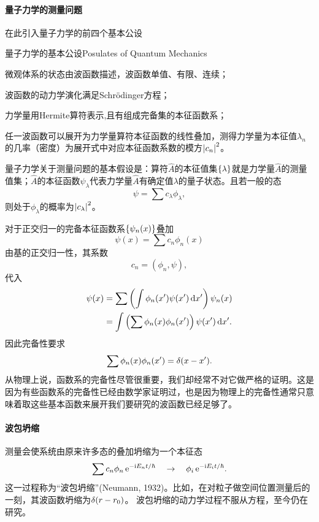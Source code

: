 \paragraph{量子力学的测量问题}在此引入量子力学的前四个基本公设
\begin{theorem}{量子力学的基本公设}{Posulates of Quantum Mechanics}
	\begin{compactenum}
		\item 微观体系的状态由波函数描述，波函数单值、有限、连续；
		\item 波函数的动力学演化满足Schrödinger方程；
		\item 力学量用Hermite算符表示,且有组成完备集的本征函数系；
		\item 任一波函数可以展开为力学量算符本征函数的线性叠加，测得力学量为本征值$\lambda_n$的几率（密度）为展开式中对应本征函数系数的模方$\left\lvert c_n\right\rvert^2$。
	\end{compactenum}
\end{theorem}
量子力学关于测量问题的基本假设是：算符$\hat A$的本征值集$\left\{\lambda\right\}$就是力学量$\hat A$的测量值集；$\hat A$的本征函数$\psi_\lambda$代表力学量$\hat A$有确定值$\lambda$的量子状态。且若一般的态
\[
	\psi=\sum c_\lambda\phi_\lambda,
\]
则处于$\phi_\lambda$的概率为$\left\lvert c_\lambda\right\rvert^2$。

对于正交归一的完备本征函数系$\left\{\psi_n(x)\right\}$叠加
\[
	\psi(x)=\sum c_n\phi_n(x)
\]
由基的正交归一性，其系数
\[
c_n=(\phi_n,\psi),
\]
代入
\begin{align*}
	\psi(x) & =\sum\left(\int\phi_n(x')\psi(x')\mathop{}\!\mathrm{d} x'\right)\psi_n(x)  \\
	        & =\int\left(\sum\phi_n(x)\phi_n(x')\right)\psi(x')\mathop{}\!\mathrm{d} x'.
\end{align*}
因此完备性要求
\begin{align}
	\sum \phi_n(x)\phi_n(x')=\mathop{}\!\delta(x-x').
\end{align}
从物理上说，函数系的完备性尽管很重要，我们却经常不对它做严格的证明。这是因为有些函数系的完备性已经由数学家证明过，也是因为物理上的完备性通常只意味着取这些基本函数来展开我们要研究的波函数已经足够了。
\paragraph{波包坍缩}测量会使系统由原来许多态的叠加坍缩为一个本征态
\[
	\sum c_n\phi_n\mathop{}\!\mathrm{e}^{-\mathrm{i} E_nt/\hbar}\quad\rightarrow\quad\phi_i\mathop{}\!\mathrm{e}^{-\mathrm{i} E_it/\hbar}.
\]
这一过程称为“波包坍缩”(Neumann, 1932)。比如，在对粒子做空间位置测量后的一刻，其波函数坍缩为$\mathop{}\!\delta(r-r_0)$。
波包坍缩的动力学过程不服从\Schr 方程，至今仍在研究。%

